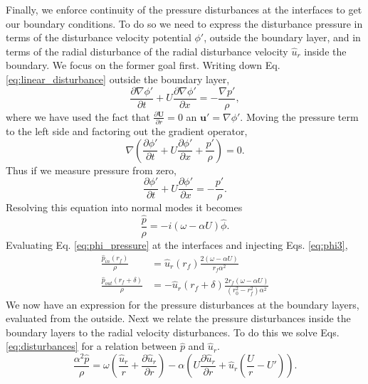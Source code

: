 \documentclass[superscriptaddress, onecolumn, prl]{revtex4}
\begin{document}
Finally, we enforce continuity of the pressure disturbances at the interfaces to get our boundary conditions. To do so we need to express the disturbance pressure in terms of the disturbance velocity potential $\phi'$, outside the boundary layer, and in terms of the radial disturbance of the radial disturbance velocity $\hat{u}_r$ inside the boundary. We focus on the former goal first. Writing down Eq. \ref{eq:linear_disturbance} outside the boundary layer,
\begin{equation}
\label{eq:linear_disturbance2}
\frac{\partial \nabla \phi' }{\partial t} + U \frac{\partial \nabla \phi'}{\partial x} = -\frac{\nabla p'}{\rho},
\end{equation} 
where we have used the fact that $\frac{\partial \textbf{U}}{\partial r}=0$ an $\textbf{u}'=\nabla \phi'$. Moving the pressure term to the left side and factoring out the gradient operator,
\begin{equation}
\label{eq:linear_disturbance3}
\nabla \left( \frac{\partial \phi' }{\partial t} + U \frac{\partial \phi'}{\partial x} + \frac{ p'}{\rho} \right) =0.
\end{equation}
Thus if we measure pressure from zero,
\begin{equation}
\frac{\partial \phi' }{\partial t} + U \frac{\partial \phi'}{\partial x} = - \frac{ p'}{\rho}.
\end{equation}
Resolving this equation into normal modes it becomes
\begin{equation}
\label{eq:phi_pressure}
\frac{ \hat{p}}{\rho} = -i (\omega - \alpha U) \hat{\phi}.
\end{equation}
Evaluating Eq. \ref{eq:phi_pressure} at the interfaces and injecting Eqs. \ref{eq:phi3},
\begin{equation}
\label{eq:pressure1}
\begin{split}
\frac{\hat{p}_{in}(r_f)}{\rho} &= \hat{u}_r(r_f) \frac{2(\omega - \alpha U)}{r_f \alpha^2} \\
\frac{\hat{p}_{out}(r_f+\delta)}{\rho} &= -\hat{u}_r(r_f+\delta) \frac{2 r_f(\omega - \alpha U)}{(r_0^2 - r_f^2) \alpha^2} 
\end{split}
\end{equation}
We now have an expression for the pressure disturbances at the boundary layers, evaluated from the outside. Next we relate the pressure disturbances inside the boundary layers to the radial velocity disturbances. To do this we solve Eqs. \ref{eq:disturbances} for a relation between $\hat{p}$ and $\hat{u}_r$.
\begin{equation}
\label{eq:pressure_velocity}
\frac{\alpha ^2 \hat{p}}{\rho}  = \omega  \left(\frac{\hat{u}_r }{r}+\frac{\partial \hat{u}_r}{\partial r} \right) - \alpha \left(U \frac{\partial \hat{u}_r}{\partial r}+\hat{u}_r \left(\frac{U}{r}-U' \right) \right). 
\end{equation}
\end{document}
